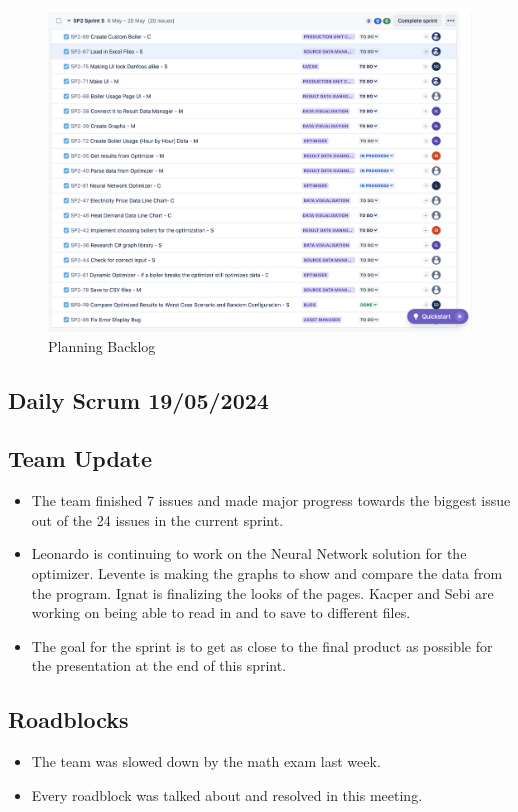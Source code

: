 \documentclass[12pt]{report}
\begin{document}
\begin{figure}[H]
  \centering
  \includegraphics[width=1\textwidth]{Resources/5-Sprint/Planning/Jira.png}
  \caption{Planning Backlog}
  \label{fig:S5Planning-image}
\end{figure}

\subsection*{Daily Scrum 19/05/2024}
\subsection*{Team Update}
\begin{itemize}
    \item The team finished 7 issues and made major progress towards the biggest issue out of the 24 issues in the current sprint.
    \item Leonardo is continuing to work on the Neural Network solution for the optimizer. Levente is making the graphs to show and compare the data from the program. Ignat is finalizing the looks of the pages. Kacper and Sebi are working on being able to read in and to save to different files.
    \item The goal for the sprint is to get as close to the final product as possible for the presentation at the end of this sprint.
\end{itemize}

\subsection*{Roadblocks}
\begin{itemize}
    \item The team was slowed down by the math exam last week.
    \item Every roadblock was talked about and resolved in this meeting.
\end{itemize}
\end{document}
